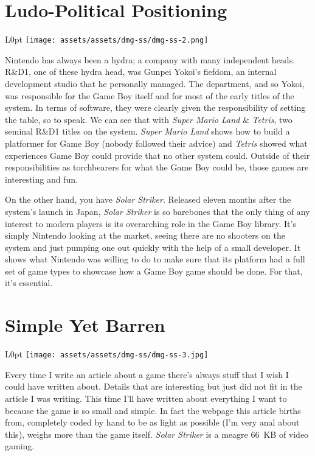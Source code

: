 \documentclass{book}
\begin{document}
\newpage\FloatBarrier\needspace{10mm}\section*{Ludo-Political Positioning}\nopagebreak[4]
\begin{wrapfigure}{L}{0pt} \texttt{[image: assets/assets/dmg-ss/dmg-ss-2.png]}\end{wrapfigure}
Nintendo has always been a hydra; a company with many independent heads. R\&D1, one of these hydra head, was Gunpei Yokoi’s fiefdom, an internal development studio that he personally managed. The department, and so Yokoi, was responsible for the Game Boy itself and for most of the early titles of the system. In terms of software, they were clearly given the responsibility of setting the table, so to speak. We can see that with \emph{Super Mario Land} \& \emph{Tetris}, two seminal R\&D1 titles on the system. \emph{Super Mario Land} shows how to build a platformer for Game Boy (nobody followed their advice) and \emph{Tetris} showed what experiences Game Boy could provide that no other system could. Outside of their responsibilities as torchbearers for what the Game Boy could be, those games are interesting and fun.

On the other hand, you have \emph{Solar Striker}. Released eleven months after the system’s launch in Japan, \emph{Solar Striker} is so barebones that the only thing of any interest to modern players is its overarching role in the Game Boy library. It’s simply Nintendo looking at the market, seeing there are no shooters on the system and just pumping one out quickly with the help of a small developer. It shows what Nintendo was willing to do to make sure that its platform had a full set of game types to showcase how a Game Boy game should be done. For that, it’s essential.

\FloatBarrier\needspace{10mm}\section*{Simple Yet Barren}\nopagebreak[4]

\begin{wrapfigure}{L}{0pt} \texttt{[image: assets/assets/dmg-ss/dmg-ss-3.jpg]}\end{wrapfigure}
Every time I write an article about a game there’s always stuff that I wish I could have written about. Details that are interesting but just did not fit in the article I was writing. This time I’ll have written about everything I want to because the game is so small and simple. In fact the webpage this article births from, completely coded by hand to be as light as possible (I’m very anal about this), weighs more than the game itself. \emph{Solar Striker} is a meagre 66~KB of video gaming.
\end{document}
